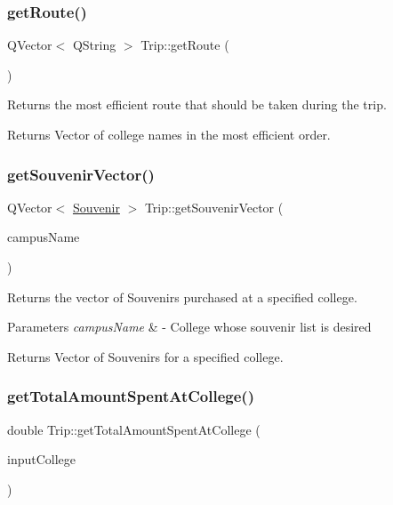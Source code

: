 \subsubsection{\texorpdfstring{get\+Route()}{getRoute()}}
{\footnotesize\ttfamily Q\+Vector$<$ Q\+String $>$ Trip\+::get\+Route (\begin{DoxyParamCaption}{ }\end{DoxyParamCaption})}



Returns the most efficient route that should be taken during the trip. 

\begin{DoxyReturn}{Returns}
Vector of college names in the most efficient order. 
\end{DoxyReturn}
\mbox{\label{class_trip_ae4f0f1e7b633d20e4f1e5522ad990546}} 
\subsubsection{\texorpdfstring{get\+Souvenir\+Vector()}{getSouvenirVector()}}
{\footnotesize\ttfamily Q\+Vector$<$ \hyperlink{class_souvenir}{Souvenir} $>$ Trip\+::get\+Souvenir\+Vector (\begin{DoxyParamCaption}\item[{Q\+String}]{campus\+Name }\end{DoxyParamCaption})}



Returns the vector of Souvenirs purchased at a specified college. 


\begin{DoxyParams}{Parameters}
{\em campus\+Name} & -\/ College whose souvenir list is desired \\
\hline
\end{DoxyParams}
\begin{DoxyReturn}{Returns}
Vector of Souvenirs for a specified college. 
\end{DoxyReturn}
\mbox{\label{class_trip_a8e1b96a203349d61a8b85342c2487d81}} 
\subsubsection{\texorpdfstring{get\+Total\+Amount\+Spent\+At\+College()}{getTotalAmountSpentAtCollege()}}
{\footnotesize\ttfamily double Trip\+::get\+Total\+Amount\+Spent\+At\+College (\begin{DoxyParamCaption}\item[{Q\+String}]{input\+College }\end{DoxyParamCaption})}



